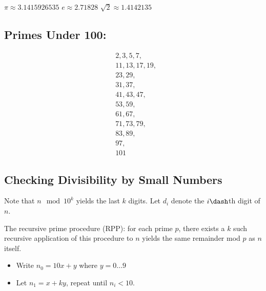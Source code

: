 \(\pi \approx 3.1415926535\) \(e \approx 2.71828\)
\(\sqrt{2} \approx 1.4142135\)

\hypertarget{primes-under-100}{%
\subsection{Primes Under 100:}\label{primes-under-100}}

\begin{align*}
& 2, 3, 5, 7, \\
& 11, 13, 17, 19, \\
& 23, 29, \\
& 31, 37, \\
& 41, 43, 47, \\
& 53, 59, \\
& 61, 67, \\
& 71, 73, 79, \\
& 83, 89, \\
& 97, \\
& 101
\end{align*}

\hypertarget{checking-divisibility-by-small-numbers}{%
\subsection{Checking Divisibility by Small
Numbers}\label{checking-divisibility-by-small-numbers}}

Note that \(n\mod 10^k\) yields the last \(k\) digits. Let \(d_i\)
denote the \(i\dash\)th digit of \(n\).

The recursive prime procedure (RPP): for each prime \(p\), there exists
a \(k\) such recursive application of this procedure to \(n\) yields the
same remainder mod \(p\) as \(n\) itself.

\begin{itemize}
\tightlist
\item
  Write \(n_0 = 10x + y\) where \(y = 0 \ldots 9\)
\item
  Let \(n_1 = x + ky\), repeat until \(n_i < 10\).
\end{itemize}

